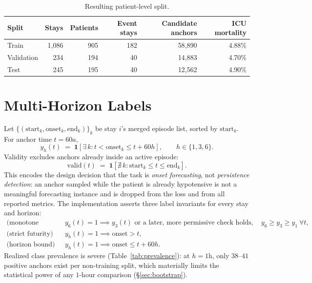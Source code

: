 \documentclass[11pt]{article}
\newcommand{\1}[1]{\mathbf{1}\!\left[#1\right]}
\begin{document}
\begin{table}[h]
\centering
\caption{Resulting patient-level split.}
\begin{tabular}{lrrrrr}
\toprule
Split & Stays & Patients & Event stays & Candidate anchors & ICU mortality \\
\midrule
Train & 1{,}086 & 905 & 182 & 58{,}890 & 4.88\% \\
Validation & 234 & 194 & 40 & 14{,}883 & 4.70\% \\
Test & 245 & 195 & 40 & 12{,}562 & 4.90\% \\
\bottomrule
\end{tabular}
\end{table}

\section{Multi-Horizon Labels}\label{sec:labels}

Let $\{(\mathrm{start}_k,\mathrm{onset}_k,\mathrm{end}_k)\}_{k}$ be stay $i$'s merged episode list, sorted by $\mathrm{start}_k$. For anchor time $t=60a$,
\begin{equation}
y_h(t) \;=\; \1{\exists\, k : t < \mathrm{onset}_k \le t+60h}, \qquad h \in \{1,3,6\}.
\end{equation}
Validity excludes anchors already inside an active episode:
\begin{equation}
\mathrm{valid}(t) \;=\; \1{\nexists\, k : \mathrm{start}_k \le t \le \mathrm{end}_k}.
\end{equation}
This encodes the design decision that the task is \emph{onset forecasting}, not \emph{persistence detection}: an anchor sampled while the patient is already hypotensive is not a meaningful forecasting instance and is dropped from the loss and from all reported metrics. The implementation asserts three label invariants for every stay and horizon:
\begin{align}
\text{(monotone nesting)} \qquad & y_6(t)=1 \implies y_3(t) \text{ or a later, more permissive check holds}, \quad y_6 \ge y_3 \ge y_1 \ \forall t,\\
\text{(strict futurity)} \qquad & y_h(t)=1 \implies \mathrm{onset} > t, \\
\text{(horizon bound)} \qquad & y_h(t)=1 \implies \mathrm{onset} \le t + 60h.
\end{align}
Realized class prevalence is severe (Table~\ref{tab:prevalence}): at $h=1$h, only $38$--$41$ positive anchors exist per non-training split, which materially limits the statistical power of any $1$-hour comparison (\S\ref{sec:bootstrap}).
\end{document}
